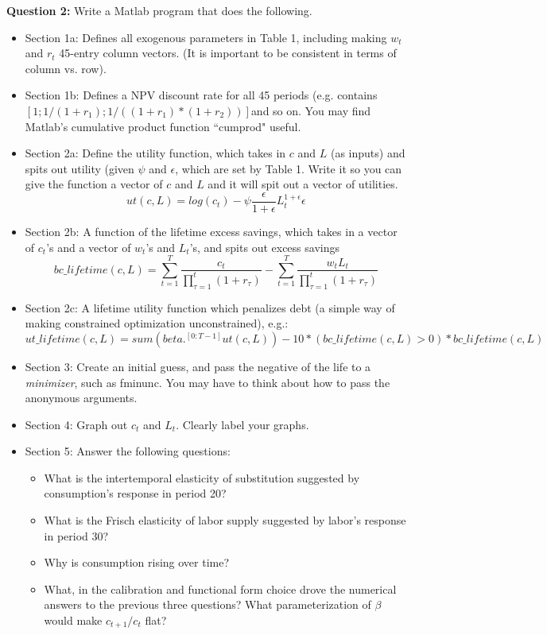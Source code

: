 \documentclass[11pt]{article}
\begin{document}
\textbf{Question 2:} Write a Matlab program that does the following.
\begin{itemize}
\item Section 1a:  Defines all exogenous parameters in Table 1, including making $w_t$ and $r_t$ 45-entry column vectors. (It is important to be consistent in terms of column vs. row).
\item Section 1b:  Defines a NPV discount rate for all 45 periods (e.g. contains $[1;1/(1+r_1) ;1/((1+r_1)*(1+r_2))] $and so on.  You may find Matlab's cumulative product function ``cumprod" useful.
\item Section 2a:  Define the utility function, which takes in $c$ and $L$ (as inputs) and spits out utility (given $\psi$ and $\epsilon$, which are set by Table 1.  Write it so you can give the function a vector of $c$ and $L$ and it will spit out a vector of utilities.
$$ut(c,L)=log(c_t)-\psi \frac{\epsilon}{1+\epsilon}L_t^{1+\epsilon}{\epsilon}$$
\item Section 2b:  A function of the lifetime excess savings, which takes in a vector of $c_t$'s and a vector of $w_t$'s and $L_t$'s, and spits out excess savings
$$bc\_lifetime(c,L)=\sum_{t=1}^T\frac{c_t}{\prod_{\tau=1}^t(1+r_\tau)}-\sum_{t=1}^T\frac{w_tL_t}{\prod_{\tau=1}^t(1+r_\tau)}$$
\item Section 2c:  A lifetime utility function which penalizes debt (a simple way of making constrained optimization unconstrained), e.g.:
$$ut\_lifetime(c,L) = sum(beta.^[0:T-1]ut(c,L))-10*(bc\_lifetime(c,L)>0)*bc\_lifetime(c,L)$$
\item Section 3:  Create an initial guess, and pass the negative of the life to a \emph{minimizer}, such as fminunc.  You may have to think about how to pass the anonymous arguments.
\item Section 4:  Graph out $c_t$ and $L_t$.  Clearly label your graphs.
\item Section 5:  Answer the following questions:
\begin{itemize}
\item What is the intertemporal elasticity of substitution suggested by consumption's response in period 20?  
\item What is the Frisch elasticity of labor supply suggested by labor's response in period 30?
\item Why is consumption rising over time?  
\item What, in the calibration and functional form choice drove the numerical answers to the previous three questions?  What parameterization of $\beta$ would make $c_{t+1}/c_t$ flat?
\end{itemize}
\end{itemize}
\end{document}
